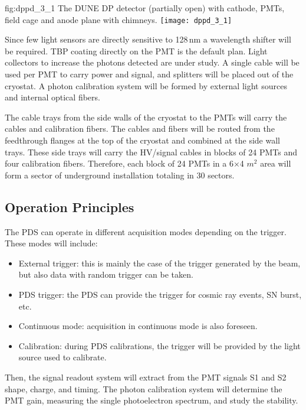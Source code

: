 \begin{dunefigure}{fig:dppd_3_1}
{The DUNE DP detector (partially open) with cathode, PMTs, field cage and anode plane with chimneys.}
\texttt{[image: dppd\_3\_1]}
\end{dunefigure}

Since few light sensors are directly sensitive to 128\,nm a wavelength shifter will be required. TBP coating directly on the PMT is the default plan. Light collectors to increase the photons detected are under study. A single cable will be used per PMT to carry power and signal, and splitters will be placed out of the cryostat. A photon calibration system will be formed by external light sources and internal optical fibers.  

The cable trays from the side walls of the cryostat to the PMTs will carry the cables and calibration fibers. The cables and fibers will be routed from the feedthrough flanges at the top of the cryostat and  combined at the side wall trays. These side trays will carry the HV/signal cables in blocks of 24 PMTs and four calibration fibers. Therefore, each block of 24 PMTs in a 6$\times$4 $m^2$ area will form a sector of underground installation totaling in 30 sectors.

\subsection{Operation Principles}
\label{sec:fddp-pd-1.5}

The PDS can operate in different acquisition modes depending on the trigger. These modes will include:

\begin{itemize}
\item External trigger: this is mainly the case of the trigger generated by the beam, but also data with random trigger can be taken. 
\item PDS trigger: the PDS can provide the trigger for cosmic ray events, SN burst, etc.
\item Continuous mode: acquisition in continuous mode is also foreseen.
\item Calibration: during PDS calibrations, the trigger will be provided by the light source used to calibrate.
\end{itemize}

Then, the signal readout system will extract from the PMT signals S1 and S2 shape, charge, and timing. The photon calibration system will determine the PMT gain, measuring the single photoelectron spectrum, and study the stability.  


